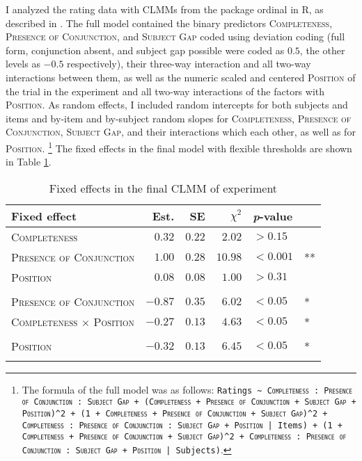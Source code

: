 I analyzed the rating data with CLMMs from the package ordinal \citep{christensen2019} in R, as described in .
The full model contained the binary predictors \textsc{Completeness}, \textsc{Presence of Conjunction}, and \textsc{Subject Gap} coded using deviation coding (full form, conjunction absent, and subject gap possible were coded as $0.5$, the other levels as $-0.5$ respectively), their three-way interaction and all two-way interactions between them, as well as the numeric scaled and centered \textsc{Position} of the trial in the experiment and all two-way interactions of the factors with \textsc{Position}.
As random effects, I included random intercepts for both subjects and items and by-item and by-subject random slopes for \textsc{Completeness}, \textsc{Presence of Conjunction}, \textsc{Subject Gap}, and their interactions which each other, as well as for \textsc{Position}.%
\footnote{The formula of the full model was as follows: \texttt{Ratings \textasciitilde ~\textsc{Completeness} : \textsc{Presence of Conjunction} : \textsc{Subject Gap} + (\textsc{Completeness} + \textsc{Presence of Conjunction}  + \textsc{Subject Gap} + \textsc{Position})\textasciicircum2 + (1 + \textsc{Completeness} + \textsc{Presence of Conjunction}  + \textsc{Subject Gap})\textasciicircum2 + \textsc{Completeness} : \textsc{Presence of Conjunction} : \textsc{Subject Gap} + \textsc{Position} | Items) + (1 + \textsc{Completeness} + \textsc{Presence of Conjunction}  + \textsc{Subject Gap})\textasciicircum2 + \textsc{Completeness} : \textsc{Presence of Conjunction} : \textsc{Subject Gap} + \textsc{Position}  | Subjects)}.}
The fixed effects in the final model with flexible thresholds are shown in Table \ref{tab:conjunctions.model}.

\begin{table}
\caption{Fixed effects in the final CLMM of experiment }
\centering
\begin{tabular}{lrrrll}
\lsptoprule
Fixed effect & Est. & SE & $\chi^2$ & \textit{p}-value &   \\
\midrule
\textsc{Completeness} & $0.32$ & $0.22$ & $2.02$ & $> 0.15$ & \\
\textsc{Presence of Conjunction} & $1.00$  & $0.28$ & $10.98$ & $< 0.001$ & \***\\
\textsc{Position} & $0.08$ & $0.08$ & $1.00$ & $> 0.31$ & \\
\Centerstack[l]{\textsc{Completeness} $\times$ \\ \textsc{Presence of Conjunction}} & $-0.87$  & $0.35$ & $6.02$ & $< 0.05$ & *\\
\textsc{Completeness} $\times$ \textsc{Position} & $-0.27$  & $0.13$ & $4.63$ & $< 0.05$& *\\
\Centerstack[l]{\textsc{Presence of Conjunction}  $\times$ \\ \textsc{Position}} & $-0.32$  & $0.13$ & $6.45$ & $< 0.05$ & *\\
\lspbottomrule
\end{tabular}
\label{tab:conjunctions.model}
\end{table}

